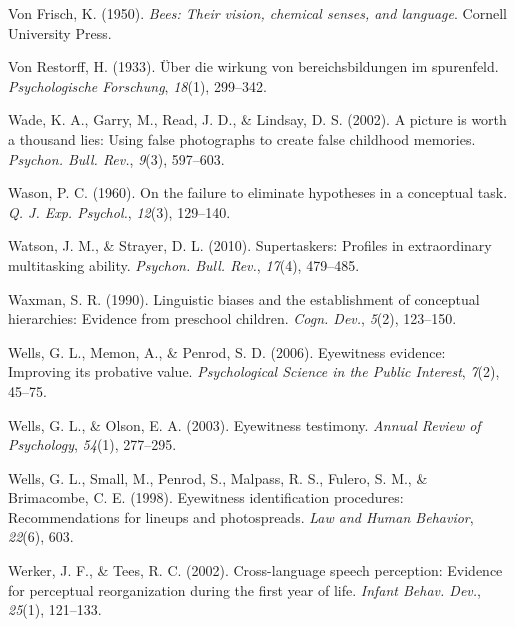 \documentclass[
]{krantz}
\newlength{\cslhangindent}
\newlength{\cslentryspacingunit} %
\newenvironment{CSLReferences}[2] %
 {%
  \setlength{\parindent}{0pt}
  \ifodd #1
  \let\oldpar\par
  \def\par{\hangindent=\cslhangindent\oldpar}
  \fi
  \setlength{\parskip}{#2\cslentryspacingunit}
 }%
 {}
\begin{document}
\begin{CSLReferences}{1}{0}
\leavevmode{}%
Von Frisch, K. (1950). \emph{Bees: Their vision, chemical senses, and language}. Cornell University Press.

\leavevmode{}%
Von Restorff, H. (1933). {Ü}ber die wirkung von bereichsbildungen im spurenfeld. \emph{Psychologische Forschung}, \emph{18}(1), 299--342.

\leavevmode{}%
Wade, K. A., Garry, M., Read, J. D., \& Lindsay, D. S. (2002). A picture is worth a thousand lies: Using false photographs to create false childhood memories. \emph{Psychon. Bull. Rev.}, \emph{9}(3), 597--603.

\leavevmode{}%
Wason, P. C. (1960). On the failure to eliminate hypotheses in a conceptual task. \emph{Q. J. Exp. Psychol.}, \emph{12}(3), 129--140.

\leavevmode{}%
Watson, J. M., \& Strayer, D. L. (2010). Supertaskers: Profiles in extraordinary multitasking ability. \emph{Psychon. Bull. Rev.}, \emph{17}(4), 479--485.

\leavevmode{}%
Waxman, S. R. (1990). Linguistic biases and the establishment of conceptual hierarchies: Evidence from preschool children. \emph{Cogn. Dev.}, \emph{5}(2), 123--150.

\leavevmode{}%
Wells, G. L., Memon, A., \& Penrod, S. D. (2006). Eyewitness evidence: Improving its probative value. \emph{Psychological Science in the Public Interest}, \emph{7}(2), 45--75.

\leavevmode{}%
Wells, G. L., \& Olson, E. A. (2003). Eyewitness testimony. \emph{Annual Review of Psychology}, \emph{54}(1), 277--295.

\leavevmode{}%
Wells, G. L., Small, M., Penrod, S., Malpass, R. S., Fulero, S. M., \& Brimacombe, C. E. (1998). Eyewitness identification procedures: Recommendations for lineups and photospreads. \emph{Law and Human Behavior}, \emph{22}(6), 603.

\leavevmode{}%
Werker, J. F., \& Tees, R. C. (2002). Cross-language speech perception: Evidence for perceptual reorganization during the first year of life. \emph{Infant Behav. Dev.}, \emph{25}(1), 121--133.


\end{CSLReferences}
\end{document}
